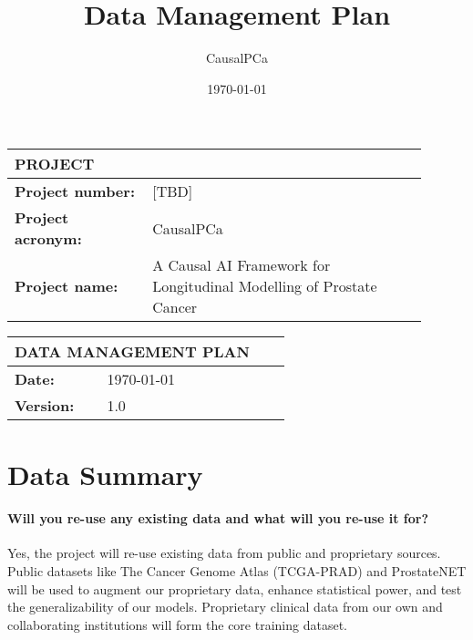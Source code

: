 \documentclass[11pt, a4paper]{article}
\title{Data Management Plan}
\author{CausalPCa}
\date{\today}
\begin{document}
\maketitle

\begin{center}
\begin{tabular}{|p{0.3\linewidth}|p{0.6\linewidth}|}
\hline
\multicolumn{2}{|l|}{\textbf{PROJECT}} \\
\hline
\textbf{Project number:} & [TBD] \\
\textbf{Project acronym:} & CausalPCa \\
\textbf{Project name:} & A Causal AI Framework for Longitudinal Modelling of Prostate Cancer \\
\hline
\end{tabular}

\vspace{1cm}

\begin{tabular}{|p{0.3\linewidth}|p{0.6\linewidth}|}
\hline
\multicolumn{2}{|l|}{\textbf{DATA MANAGEMENT PLAN}} \\
\hline
\textbf{Date:} & \today \\
\textbf{Version:} & 1.0 \\
\hline
\end{tabular}
\end{center}

\section*{Data Summary}

\paragraph{Will you re-use any existing data and what will you re-use it for?}
Yes, the project will re-use existing data from public and proprietary sources. Public datasets like The Cancer Genome Atlas (TCGA-PRAD) and ProstateNET will be used to augment our proprietary data, enhance statistical power, and test the generalizability of our models. Proprietary clinical data from our own and collaborating institutions will form the core training dataset.
\end{document}
